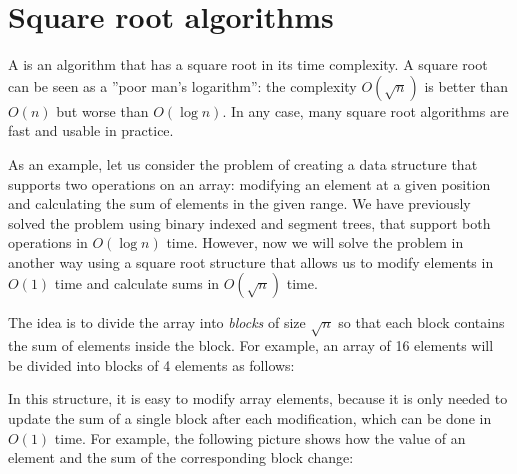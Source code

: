 \chapter{Square root algorithms}


A  is an algorithm
that has a square root in its time complexity.
A square root can be seen as a ''poor man's logarithm'':
the complexity $O(\sqrt n)$ is better than $O(n)$
but worse than $O(\log n)$.
In any case, many square root algorithms are fast and usable in practice.

As an example, let us consider the problem of
creating a data structure that supports
two operations on an array:
modifying an element at a given position
and calculating the sum of elements in the given range.
We have previously solved the problem using
binary indexed and segment trees,
that support both operations in $O(\log n)$ time.
However, now we will solve the problem
in another way using a square root structure
that allows us to modify elements in $O(1)$ time
and calculate sums in $O(\sqrt n)$ time.

The idea is to divide the array into \emph{blocks}
of size $\sqrt n$ so that each block contains
the sum of elements inside the block.
For example, an array of 16 elements will be
divided into blocks of 4 elements as follows:

\begin{center}
\end{center}

In this structure,
it is easy to modify array elements,
because it is only needed to update
the sum of a single block
after each modification,
which can be done in $O(1)$ time.
For example, the following picture shows
how the value of an element and
the sum of the corresponding block change:

